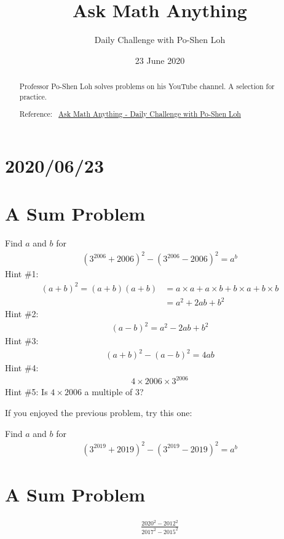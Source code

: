 \documentclass[12pt]{article}
\title{Ask Math Anything}
\author{Daily Challenge with Po-Shen Loh}
\date{23 June 2020}
\newenvironment{answer}{\vspace{1em}\color{blue!90!black}}{}
\newenvironment{answer}{\vspace{0em}\expandafter\comment}{\expandafter\endcomment}
\begin{document}
\begin{minipage}{\textwidth}
\maketitle
\begin{abstract}
Professor Po-Shen Loh solves problems on his YouTube channel. A selection for practice. 

Reference:~ 
\href{https://www.youtube.com/channel/UCf78EJOm4wQ4xXwSS15PuxQ}{Ask Math Anything - Daily Challenge with Po-Shen Loh}
\end{abstract}
\end{minipage}

\section*{2020/06/23}
\section{A Sum Problem}
Find $a$ and $b$ for
\begin{align*}
(3^{2006} + 2006)^2 - (3^{2006} - 2006)^2 = a^{b}
\end{align*}
\begin{answer}
Hint \#1: 
\begin{align*}
(a+b)^2 = (a+b)(a+b) 
  & = a \times a + a \times b + b \times a + b \times b \\
  & = a^2 + 2 ab + b^2
\end{align*}
Hint \#2:
\begin{align*}
(a-b)^2 = a^2 - 2 ab + b^2
\end{align*}
Hint \#3:
\begin{align*}
(a+b)^2 - (a-b)^2 =  4 ab
\end{align*}
Hint \#4:
\begin{align*}
4 \times 2006 \times 3^{2006}
\end{align*}
Hint \#5: Is $4 \times 2006$ a multiple of $3$?

\bigskip

If you enjoyed the previous problem, try this one:
\bigskip

Find $a$ and $b$ for
\begin{align*}
(3^{2019} + 2019)^2 - (3^{2019} - 2019)^2 = a^{b}
\end{align*}
\end{answer}


\section{A Sum Problem}
\begin{align*}
\frac{2020^2 - 2012^2}{2017^2 - 2015^2}
\end{align*}
\end{document}
